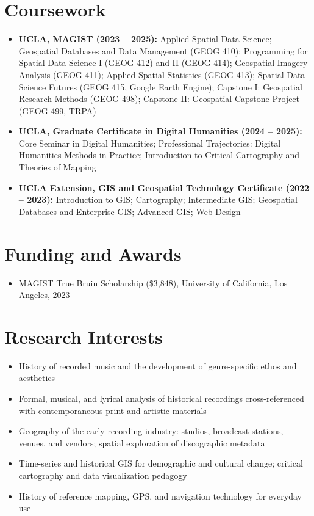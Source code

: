\documentclass[letterpaper,10pt]{article}
\newlength{\bulletgap}  \setlength{\bulletgap}{0pt}  %
\newlength{\groupindent}\setlength{\groupindent}{0.15in} %
\newcommand{\resumeItem}[1]{\item \small{#1}}
\newif\ifresumecont \resumecontfalse
\newcommand{\resumeItemListStart}{%
  \begin{itemize}[leftmargin=\groupindent, itemsep=\bulletgap,
                  parsep=0pt, topsep=1pt, partopsep=0pt]}
\newcommand{\resumeItemListEnd}{\resumecontfalse\end{itemize}}
\begin{document}
\section{Coursework}
    \resumeItemListStart
      \resumeItem{\textbf{UCLA, MAGIST (2023 -- 2025):} Applied Spatial Data Science; Geospatial Databases and Data Management (GEOG 410); Programming for Spatial Data Science I (GEOG 412) and II (GEOG 414); Geospatial Imagery Analysis (GEOG 411); Applied Spatial Statistics (GEOG 413); Spatial Data Science Futures (GEOG 415, Google Earth Engine); Capstone I: Geospatial Research Methods (GEOG 498); Capstone II: Geospatial Capstone Project (GEOG 499, TRPA)}
      \resumeItem{\textbf{UCLA, Graduate Certificate in Digital Humanities (2024 -- 2025):} Core Seminar in Digital Humanities; Professional Trajectories: Digital Humanities Methods in Practice; Introduction to Critical Cartography and Theories of Mapping}
      \resumeItem{\textbf{UCLA Extension, GIS and Geospatial Technology Certificate (2022 -- 2023):} Introduction to GIS; Cartography; Intermediate GIS; Geospatial Databases and Enterprise GIS; Advanced GIS; Web Design}
    \resumeItemListEnd


\section{Funding and Awards}
    \resumeItemListStart
      \resumeItem{\small MAGIST True Bruin Scholarship (\$3,848), University of California, Los Angeles, 2023}
    \resumeItemListEnd



\section{Research Interests}
    \resumeItemListStart
      \resumeItem{\small History of recorded music and the development of genre-specific ethos and aesthetics}
      \resumeItem{\small Formal, musical, and lyrical analysis of historical recordings cross-referenced with contemporaneous print and artistic materials}
      \resumeItem{\small Geography of the early recording industry: studios, broadcast stations, venues, and vendors; spatial exploration of discographic metadata}
      \resumeItem{\small Time-series and historical GIS for demographic and cultural change; critical cartography and data visualization pedagogy}
      \resumeItem{\small History of reference mapping, GPS, and navigation technology for everyday use}
    \resumeItemListEnd
\end{document}
